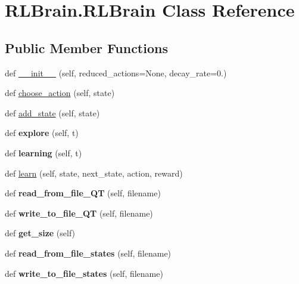 \hypertarget{classRLBrain_1_1RLBrain}{}\section{R\+L\+Brain.\+R\+L\+Brain Class Reference}
\label{classRLBrain_1_1RLBrain}
\subsection*{Public Member Functions}
\begin{DoxyCompactItemize}
\item 
def \hyperlink{classRLBrain_1_1RLBrain_a40f979542aaadb4826a1b6ab8cb76fa9}{\+\_\+\+\_\+init\+\_\+\+\_\+} (self, reduced\+\_\+actions=None, decay\+\_\+rate=0.)
\item 
def \hyperlink{classRLBrain_1_1RLBrain_a64d74e364a6d9fb49b888363dbd9f922}{choose\+\_\+action} (self, state)
\item 
def \hyperlink{classRLBrain_1_1RLBrain_af39e6aad4cc89b805c6cb09877db1e09}{add\+\_\+state} (self, state)
\item 
def {\bfseries explore} (self, t)\hypertarget{classRLBrain_1_1RLBrain_a2cdec6a8eb09e6bb0f5c24251659ed56}{}\label{classRLBrain_1_1RLBrain_a2cdec6a8eb09e6bb0f5c24251659ed56}

\item 
def {\bfseries learning} (self, t)\hypertarget{classRLBrain_1_1RLBrain_a5cd8667073eafe18d7e9a42cda61606d}{}\label{classRLBrain_1_1RLBrain_a5cd8667073eafe18d7e9a42cda61606d}

\item 
def \hyperlink{classRLBrain_1_1RLBrain_acfa575d5f9331948ca20f9ccbf408886}{learn} (self, state, next\+\_\+state, action, reward)
\item 
def {\bfseries read\+\_\+from\+\_\+file\+\_\+\+QT} (self, filename)\hypertarget{classRLBrain_1_1RLBrain_a32246b81b1fef3ea2ae090b234c3b4f3}{}\label{classRLBrain_1_1RLBrain_a32246b81b1fef3ea2ae090b234c3b4f3}

\item 
def {\bfseries write\+\_\+to\+\_\+file\+\_\+\+QT} (self, filename)\hypertarget{classRLBrain_1_1RLBrain_a250a60c697c0748a12ac58eebaee6f7d}{}\label{classRLBrain_1_1RLBrain_a250a60c697c0748a12ac58eebaee6f7d}

\item 
def {\bfseries get\+\_\+size} (self)\hypertarget{classRLBrain_1_1RLBrain_a007381445651792bf63a1d7b80c4a7f2}{}\label{classRLBrain_1_1RLBrain_a007381445651792bf63a1d7b80c4a7f2}

\item 
def {\bfseries read\+\_\+from\+\_\+file\+\_\+states} (self, filename)\hypertarget{classRLBrain_1_1RLBrain_a58ffb2733e58bba78ad1bdc47a7566cb}{}\label{classRLBrain_1_1RLBrain_a58ffb2733e58bba78ad1bdc47a7566cb}

\item 
def {\bfseries write\+\_\+to\+\_\+file\+\_\+states} (self, filename)\hypertarget{classRLBrain_1_1RLBrain_a0a32317798997801933b51fa11e8678b}{}\label{classRLBrain_1_1RLBrain_a0a32317798997801933b51fa11e8678b}

\end{DoxyCompactItemize}
